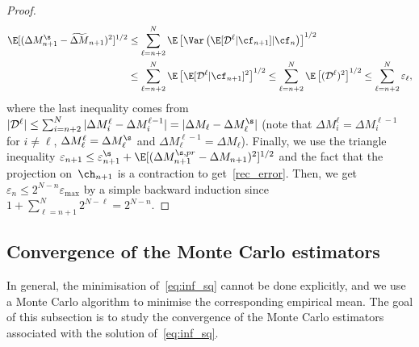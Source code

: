 \begin{proof}
\begin{align*}
  \E[(\Delta {M}^\s_{n+1}-\widetilde{\Delta {M}}_{n+1})^2]^{1/2}&\le  \sum_{\ell=n+2}^{N} \E\left[\Var\left(\E[\mathcal{D}^\ell |\cf_{n+1}] |\cf_n \right)\right]^{1/2} \\
  & \le \sum_{\ell=n+2}^{N} \E\left[\E[\mathcal{D}^\ell |\cf_{n+1}]^2\right]^{1/2} \le \sum_{\ell=n+2}^{N} \E\left[(\mathcal{D}^\ell)^2\right]^{1/2} \le \sum_{\ell=n+2}^{N} \varepsilon_\ell,
\end{align*}
where the last inequality comes from $|\mathcal{D}^\ell|\le \sum_{i=n+2}^{N} |\Delta {M}^{\ell}_i -\Delta {M}^{\ell-1}_i|  =  |\Delta M_\ell -\Delta M^\s_\ell|$ (note that $\Delta M_i^\ell=\Delta M_i^{\ell-1}$ for $i\not=\ell$, $\Delta M_\ell^\ell=\Delta M^\s_\ell$ and $\Delta M^{\ell-1}_\ell=\Delta M_\ell$). Finally, we use the triangle inequality $\varepsilon_{n+1}\le \varepsilon^\s_{n+1}+\E[(\Delta {M}^{\s,pr}_{n+1}-\Delta {M}_{n+1})^2]^{1/2}$ and the fact that the projection on~$\ch_{n+1}$ is a contraction to get~\eqref{rec_error}.
Then, we get $\varepsilon_n\le 2^{N-n} \varepsilon_{\max}$ by a simple backward induction since $1+\sum_{\ell=n+1}^N 2^{N-\ell}=2^{N-n}$.
\end{proof}







\subsection{Convergence of the Monte Carlo estimators}


In general, the minimisation of~\eqref{eq:inf_sq} cannot be done explicitly, and we use a Monte Carlo algorithm to minimise the corresponding empirical mean. The goal of this subsection is to study the convergence of the Monte Carlo estimators associated with the solution of~\eqref{eq:inf_sq}.

